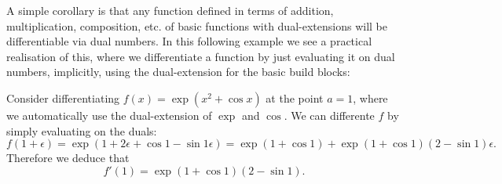 A simple corollary is that any function defined in terms of addition, multiplication, composition, etc. of basic functions with dual-extensions will be differentiable via dual numbers. In this following example we see a practical realisation of this, where we differentiate a function by just evaluating it on dual numbers, implicitly, using the dual-extension for the basic build blocks:

\begin{example}

Consider differentiating $f(x) =  \exp(x^2 + \cos x)$ at the point $a = 1$, where  we automatically use the dual-extension of $\exp$ and $\cos$. We can differente $f$ by simply evaluating on the duals:
\[
f(1 + \ensuremath{\epsilon}) = \exp(1 + 2\ensuremath{\epsilon} + \cos 1 - \sin 1 \ensuremath{\epsilon}) =  \exp(1 + \cos 1) + \exp(1 + \cos 1) (2 - \sin 1) \ensuremath{\epsilon}.
\]
Therefore we deduce that
\[
f'(1) = \exp(1 + \cos 1) (2 - \sin 1).
\]
\end{example}




